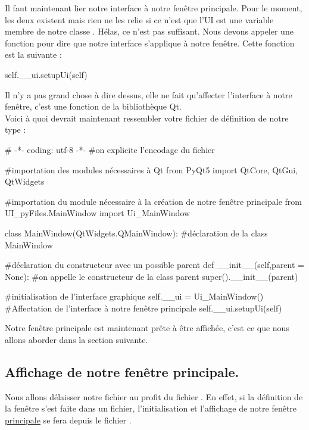 Il faut maintenant lier notre interface à notre fenêtre principale. Pour le moment, les deux existent mais rien ne les relie si ce n'est que l'UI est une variable membre de notre classe . Hélas, ce n'est pas suffisant. Nous devons appeler une fonction pour dire que notre interface s'applique à notre fenêtre. Cette fonction est la suivante :
\begin{Python}
self.__ui.setupUi(self)
\end{Python}
Il n'y a pas grand chose à dire dessus, elle ne fait qu'affecter l'interface à notre fenêtre, c'est une fonction de la bibliothèque Qt.\\

Voici à quoi devrait maintenant ressembler votre fichier de définition de notre type  :
\begin{Python}
# -*- coding: utf-8 -*-
#on explicite l’encodage du fichier

#importation des modules nécessaires à Qt
from PyQt5 import QtCore, QtGui, QtWidgets

#importation du module nécessaire à la création de notre fenêtre principale
from UI_pyFiles.MainWindow import Ui_MainWindow

class MainWindow(QtWidgets.QMainWindow): #déclaration de la class MainWindow

	#déclaration du constructeur avec un possible parent
	def __init__(self,parent = None):
		#on appelle le constructeur de la class parent
		super().__init__(parent)

		#initialisation de l'interface graphique
		self.__ui = Ui_MainWindow()
		#Affectation de l'interface à notre fenêtre principale
		self.__ui.setupUi(self)
\end{Python}


Notre fenêtre principale est maintenant prête à être affichée, c'est ce que nous allons aborder dans la section suivante.


\subsection{Affichage de notre fenêtre principale.}

Nous allons délaisser notre fichier  au profit du fichier . En effet, si la définition de la fenêtre s'est faite dans un fichier, l'initialisation et l'affichage de notre fenêtre \underline{principale} se fera depuis le fichier .\\


